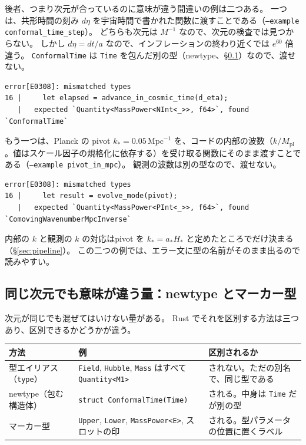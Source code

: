 \documentclass[a4paper,11pt]{ltjsarticle}
\newcommand{\Mpl}{M_{\mathrm{pl}}}
\newcommand{\code}[1]{\texttt{#1}}
\begin{document}
後者、つまり次元が合っているのに意味が違う間違いの例は二つある。
一つは、共形時間の刻み $d\eta$ を宇宙時間で書かれた関数に渡すことである（\code{--example conformal\_time\_step}）。
どちらも次元は $M^{-1}$ なので、次元の検査では見つからない。
しかし $d\eta=dt/a$ なので、インフレーションの終わり近くでは $e^{60}$ 倍違う。
\code{ConformalTime} は \code{Time} を包んだ別の型（newtype、\S\ref{sec:marker}）なので、渡せない。
\begin{lstlisting}[language={}]
error[E0308]: mismatched types
16 |     let elapsed = advance_in_cosmic_time(d_eta);
   |   expected `Quantity<MassPower<NInt<_>>, f64>`, found `ConformalTime`
\end{lstlisting}

もう一つは、Planck の pivot $k_*=0.05\,\mathrm{Mpc}^{-1}$ を、コードの内部の波数（$k/\Mpl$。値はスケール因子の規格化に依存する）を受け取る関数にそのまま渡すことである（\code{--example pivot\_in\_mpc}）。
観測の波数は別の型なので、渡せない。
\begin{lstlisting}[language={}]
error[E0308]: mismatched types
16 |     let result = evolve_mode(pivot);
   |   expected `Quantity<MassPower<PInt<_>>, f64>`, found `ComovingWavenumberMpcInverse`
\end{lstlisting}
内部の $k$ と観測の $k$ の対応はpivot を $k_*=a_*H_*$ と定めたところでだけ決まる（\S\ref{sec:pipeline}）。
この二つの例では、エラー文に型の名前がそのまま出るので読みやすい。

\subsection{同じ次元でも意味が違う量：newtype とマーカー型}
\label{sec:marker}

次元が同じでも混ぜてはいけない量がある。
Rust でそれを区別する方法は三つあり、区別できるかどうかが違う。

\begin{center}
\small
\begin{tabular}{>{\raggedright\arraybackslash}p{2.8cm}>{\raggedright\arraybackslash}p{5.4cm}>{\raggedright\arraybackslash}p{5.4cm}}
\toprule
方法 & 例 & 区別されるか \\
\midrule
型エイリアス（\code{type}） & \code{Field}, \code{Hubble}, \code{Mass} はすべて \code{Quantity<M1>} & されない。ただの別名で、同じ型である \\
newtype（包む構造体） & \code{struct ConformalTime(Time)} & される。中身は \code{Time} だが別の型 \\
マーカー型 & \code{Upper}, \code{Lower}, \code{MassPower<E>}, スロットの印 & される。型パラメータの位置に置くラベル \\
\bottomrule
\end{tabular}
\end{center}
\end{document}
